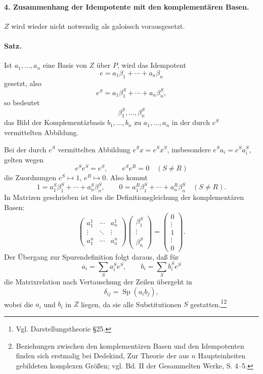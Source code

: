 \documentclass[11pt]{article}
\providecommand{\Sp}{\operatorname{Sp}}
\begin{document}
\paragraph{4. Zusammenhang der Idempotente mit den komplementären Basen.}
\(Z\) wird wieder nicht notwendig als galoissch vorausgesetzt.

\paragraph{Satz.}
Ist \(a_1,\ldots,a_n\) eine Basis von \(Z\) über \(P\), wird das Idempotent
\[
        e=a_1\beta_1+\cdots+a_n\beta_n
\]
gesetzt, also
\[
        e^S=a_1\beta_1^S+\cdots+a_n\beta_n^S,
\]
so bedeutet
\[
        \beta_1^S,\ldots,\beta_n^S
\]
das Bild der Komplementärbasis \(b_1,\ldots,b_n\) zu \(a_1,\ldots,a_n\) in der durch \(e^S\) vermittelten Abbildung.

Bei der durch \(e^S\) vermittelten Abbildung \(e^Sx=e^Sx^S\), insbesondere \(e^Sa_i=e^Sa_i^S\), gelten wegen
\[
        e^Se^S=e^S,\qquad e^Se^R=0\quad(S\ne R)
\]
die Zuordnungen \(e^S\mapsto1\), \(e^R\mapsto0\). Also kommt
\[
        1=a_1^S\beta_1^S+\cdots+a_n^S\beta_n^S,\qquad
        0=a_1^R\beta_1^S+\cdots+a_n^R\beta_n^S\quad(S\ne R).
\]
In Matrizen geschrieben ist dies die Definitionsgleichung der komplementären Basen:
\[
\begin{pmatrix}
a_1^1 & \cdots & a_n^1\\
\vdots & \ddots & \vdots\\
a_1^n & \cdots & a_n^n
\end{pmatrix}
\begin{pmatrix}
\beta_1^S\\ \vdots\\ \beta_n^S
\end{pmatrix}
=
\begin{pmatrix}
0\\ \vdots\\ 1\\ \vdots\\ 0
\end{pmatrix}.
\]
Der Übergang zur Spurendefinition folgt daraus, daß für
\[
        a_i=\sum_S a_i^S e^S,\qquad b_i=\sum_S b_i^S e^S
\]
die Matrixrelation nach Vertauschung der Zeilen übergeht in
\[
        \delta_{ij}=\Sp(a_i b_j),
\]
wobei die \(a_i\) und \(b_i\) in \(Z\) liegen, da sie alle Substitutionen \(S\) gestatten.\footnote{Vgl. Darstellungstheorie §25.}\footnote{Beziehungen zwischen den komplementären Basen und den Idempotenten finden sich erstmalig bei Dedekind, Zur Theorie der aus \(n\) Haupteinheiten gebildeten komplexen Größen; vgl. Bd. II der Gesammelten Werke, S. 4--5.}
\end{document}
